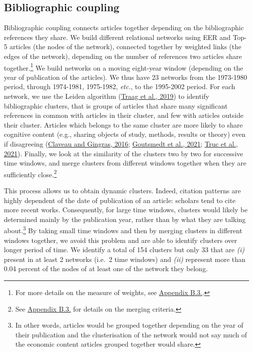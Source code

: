 \documentclass[
]{article}
\begin{document}
\hypertarget{bibliographic-coupling}{%
\subsection{Bibliographic coupling}\label{bibliographic-coupling}}

Bibliographic coupling connects articles together depending on the
bibliographic references they share. We build different relational
networks using EER and Top-5 articles (the nodes of the network),
connected together by weighted links (the edges of the network),
depending on the number of references two articles share
together.\footnote{For more details on the measure of weights, see
  \protect\hyperlink{network}{Appendix B.3.}.} We build networks on a
moving eight-year window (depending on the year of publication of the
articles). We thus have 23 networks from the 1973-1980 period, through
1974-1981, 1975-1982, \emph{etc.}, to the 1995-2002 period. For each
network, we use the Leiden algorithm
(\protect\hyperlink{ref-traag2019}{Traag et al., 2019}) to identify
bibliographic clusters, that is groups of articles that share many
significant references in common with articles in their cluster, and few
with articles outside their cluster. Articles which belongs to the same
cluster are more likely to share cognitive content (e.g., sharing
objects of study, methods, results or theory) even if disagreeing
(\protect\hyperlink{ref-claveau2016}{Claveau and Gingras, 2016};
\protect\hyperlink{ref-goutsmedt2021}{Goutsmedt et al., 2021};
\protect\hyperlink{ref-truc2021}{Truc et al., 2021}). Finally, we look
at the similarity of the clusters two by two for successive time
windows, and merge clusters from different windows together when they
are sufficiently close.\footnote{See
  \protect\hyperlink{network}{Appendix B.3.} for details on the merging
  criteria.}

This process allows us to obtain dynamic clusters. Indeed, citation
patterns are highly dependent of the date of publication of an article:
scholars tend to cite more recent works. Consequently, for large time
windows, clusters would likely be determined mainly by the publication
year, rather than by what they are talking about.\footnote{In other
  words, articles would be grouped together depending on the year of
  their publication and the clusterisation of the network would not say
  much of the economic content articles grouped together would share.}
By taking small time windows and then by merging clusters in different
windows together, we avoid this problem and are able to identify
clusters over longer period of time. We identify a total of 154 clusters
but only 33 that are \emph{(i)} present in at least 2 networks (i.e.~2
time windows) and \emph{(ii)} represent more than 0.04 percent of the
nodes of at least one of the network they belong.
\end{document}
